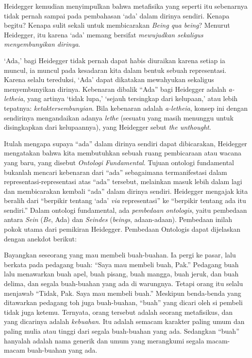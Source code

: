 \documentclass[10pt,a4paper]{article}
\renewenvironment{quote}
{\list{}{%
       \leftmargin 1.5em 
       \rightmargin 0em}
   \item\relax}
{\endlist}
\begin{document}
\begin{multicols}{2}
Heidegger kemudian menyimpulkan bahwa metafisika yang seperti itu
sebenarnya tidak pernah sampai pada pembahasan `ada' dalam dirinya
sendiri. Kenapa begitu? Kenapa sulit sekali untuk membicarakan
\emph{Being qua being}? Menurut Heidegger, itu karena `ada' memang
bersifat \emph{mewujudkan sekaligus menyembunyikan dirinya}.

`Ada,' bagi Heidegger tidak pernah dapat habis diuraikan karena setiap
ia muncul, ia muncul pada kesadaran kita dalam bentuk sebuah
representasi. Karena selalu tereduksi, `Ada' dapat dikatakan mewahyukan
sekaligus menyembunyikan dirinya. Kebenaran dibalik ``Ada'' bagi
Heidegger adalah \emph{a-letheia}, yang artinya `tidak lupa,' `sejauh
tersingkap dari kelupaan,' atau lebih tepatnya:
\emph{ketaktersembunyian}. Bila kebenaran adalah \emph{a-letheia},
konsep ini dengan sendirinya mengandaikan adanya \emph{lethe} (sesuatu
yang masih menunggu untuk disingkapkan dari kelupaannya), yang Heidegger
sebut \emph{the unthought}.

Itulah mengapa supaya ``ada'' dalam dirinya sendiri dapat dibicarakan,
Heidegger mengatakan bahwa kita membutuhkan sebuah ruang pembicaraan
atau wacana yang baru, yang disebut \emph{Ontologi Fundamental}. Tujuan
ontologi fundamental bukanlah mencari kebenaran dari ``ada'' sebagaimana
termanifestasi dalam representasi-representasi atas ``ada'' tersebut,
melainkan masuk lebih dalam lagi dan membicarakan kembali ``ada'' dalam
dirinya sendiri. Heidegger mengajak kita beralih dari ``berpikir tentang
`ada' \emph{via} representasi'' ke ``berpikir tentang ada itu sendiri.''
Dalam ontologi fundamental, ada \emph{pembedaan ontologis}, yaitu
pembedaan antara \emph{Sein} (\emph{Be}, Ada) dan \emph{Seindes}
(\emph{beings}, adaan-adaan). Pembedaan inilah pokok utama dari
pemikiran Heidegger. Pembedaan Ontologis dapat dijelaskan dengan anekdot
berikut:

\begin{quote}
Bayangkan seseorang yang mau membeli buah-buahan. Ia pergi ke pasar,
lalu berkata pada pedagang buah: ``Saya mau membeli buah, Pak.''
Pedagang buah lalu menawarkan buah apel, buah pisang, buah mangga, buah
jeruk, dan buah delima, dan segala buah-buahan yang ada di warungnya.
Tetapi orang itu selalu menjawab ``Tidak, Pak. Saya mau membeli buah.''
Meskipun benda-benda yang ditawarkan pedagang toh juga buah-buahan,
``buah'' yang dicari oleh si pembeli tidak juga ketemu. Ternyata, orang
tersebut adalah seorang metafisikus, dan yang dicarinya adalah
\emph{kebuahan}. Itu adalah semacam karakter paling umum dan paling
mulia atau tinggi dari segala buah-buahan yang ada. Sedangkan ``buah''
hanyalah adalah nama generik dan umum yang merangkumi segala macam-macam
buah-buahan yang ada.
\end{quote}


\end{multicols}
\end{document}
